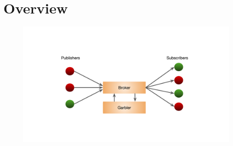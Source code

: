 \section{Overview}
\label{sec:overview}

\begin{figure}[h]
	\centering
	\includegraphics[width=1.0\columnwidth]{figures/pps}
	\caption{}
	\label{fig:pps}
\end{figure}
